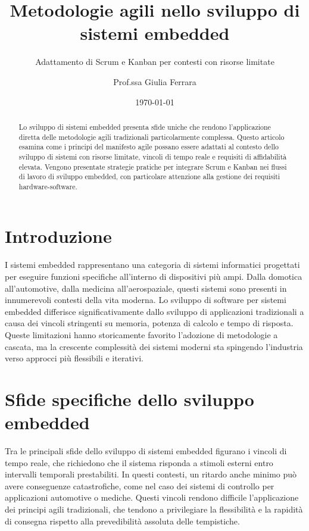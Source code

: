 \documentclass[
    language=italian,
    doctype=article,
]{../../omnilatex}
\title{Metodologie agili nello sviluppo di sistemi embedded}
\subtitle{Adattamento di Scrum e Kanban per contesti con risorse limitate}
\author{Prof.ssa Giulia Ferrara}
\date{\today}
\begin{document}
\maketitle

\begin{abstract}
Lo sviluppo di sistemi embedded presenta sfide uniche che rendono l'applicazione diretta delle metodologie agili tradizionali particolarmente complessa. Questo articolo esamina come i principi del manifesto agile possano essere adattati al contesto dello sviluppo di sistemi con risorse limitate, vincoli di tempo reale e requisiti di affidabilità elevata. Vengono presentate strategie pratiche per integrare Scrum e Kanban nei flussi di lavoro di sviluppo embedded, con particolare attenzione alla gestione dei requisiti hardware-software.
\end{abstract}

\section{Introduzione}
I sistemi embedded rappresentano una categoria di sistemi informatici progettati per eseguire funzioni specifiche all'interno di dispositivi più ampi. Dalla domotica all'automotive, dalla medicina all'aerospaziale, questi sistemi sono presenti in innumerevoli contesti della vita moderna. Lo sviluppo di software per sistemi embedded differisce significativamente dallo sviluppo di applicazioni tradizionali a causa dei vincoli stringenti su memoria, potenza di calcolo e tempo di risposta. Queste limitazioni hanno storicamente favorito l'adozione di metodologie a cascata, ma la crescente complessità dei sistemi moderni sta spingendo l'industria verso approcci più flessibili e iterativi.

\section{Sfide specifiche dello sviluppo embedded}
Tra le principali sfide dello sviluppo di sistemi embedded figurano i vincoli di tempo reale, che richiedono che il sistema risponda a stimoli esterni entro intervalli temporali prestabiliti. In questi contesti, un ritardo anche minimo può avere conseguenze catastrofiche, come nel caso dei sistemi di controllo per applicazioni automotive o mediche. Questi vincoli rendono difficile l'applicazione dei principi agili tradizionali, che tendono a privilegiare la flessibilità e la rapidità di consegna rispetto alla prevedibilità assoluta delle tempistiche.
\end{document}
